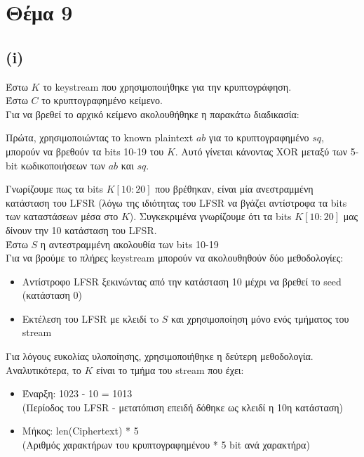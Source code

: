 \documentclass[a4paper, 11pt]{article}
\newcommand{\lt}{\latintext}
\begin{document}
\newpage


\section*{Θέμα 9}
\subsection*{{\lt (i)}}
Έστω $K$ το {\lt keystream} που χρησιμοποιήθηκε για την κρυπτογράφηση.\\
Έστω $C$ το κρυπτογραφημένο κείμενο.\\
Για να βρεθεί το αρχικό κείμενο ακολουθήθηκε η παρακάτω διαδικασία:

Πρώτα, χρησιμοποιώντας το {\lt known plaintext} $ab$ για το κρυπτογραφημένο $sq$, μπορούν να βρεθούν τα {\lt bits} 10-19 του $Κ$.
Αυτό γίνεται κάνοντας {\lt XOR} μεταξύ των 5-{\lt bit} κωδικοποιήσεων των $ab$ και $sq$.

Γνωρίζουμε πως τα {\lt bits} $Κ[10:20]$ που βρέθηκαν, είναι μία ανεστραμμένη κατάσταση του {\lt LFSR} (λόγω της ιδιότητας του {\lt LFSR} να βγάζει
αντίστροφα τα {\lt bits} των καταστάσεων μέσα στο $K$). Συγκεκριμένα γνωρίζουμε ότι τα {\lt bits} $Κ[10:20]$ μας δίνουν την 10 κατάσταση του {\lt LFSR}.\\

\noindent Έστω $S$ η αντεστραμμένη ακολουθία των {\lt bits} 10-19\\

Για να βρούμε το πλήρες {\lt keystream} μπορούν να ακολουθηθούν δύο μεθοδολογίες:

\begin{itemize}
\item Αντίστροφο {\lt LFSR} ξεκινώντας από την κατάσταση 10 μέχρι να βρεθεί το {\lt seed} (κατάσταση 0)
\item Εκτέλεση του {\lt LFSR} με κλειδί τo $S$ και χρησιμοποίηση μόνο ενός τμήματος του {\lt stream}
\end{itemize}

Για λόγους ευκολίας υλοποίησης, χρησιμοποιήθηκε η δεύτερη μεθοδολογία. Αναλυτικότερα, το $Κ$ είναι το τμήμα του {\lt stream} που έχει:\\
\begin{itemize}
\item Έναρξη: 1023 - 10 = 1013 \\(Περίοδος του {\lt LFSR} - μετατόπιση επειδή δόθηκε ως κλειδί η 10η κατάσταση)\\
\item Μήκος: {\lt len(Ciphertext)} * 5 \\(Αριθμός χαρακτήρων του κρυπτογραφημένου * 5 {\lt bit} ανά χαρακτήρα)\\
\end{itemize}
\end{document}
